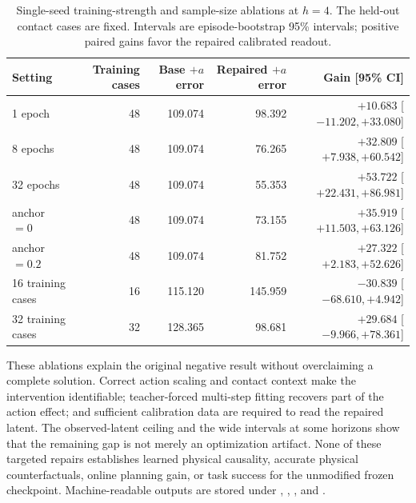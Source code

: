 \documentclass{article}
\begin{document}
\begin{table}[H]
\centering
\scriptsize
\setlength{\tabcolsep}{4pt}
\caption{Single-seed training-strength and sample-size ablations at $h=4$.
The held-out contact cases are fixed. Intervals are episode-bootstrap 95\%
intervals; positive paired gains favor the repaired calibrated readout.}
\label{tab:supp-teacher-forced-ablation}
\begin{tabular}{lrrrr}
\toprule
Setting & Training cases & Base $+a$ error & Repaired $+a$ error & Gain [95\% CI] \\
\midrule
1 epoch & 48 & 109.074 & 98.392 & $+10.683$ [$-11.202,+33.080$] \\
8 epochs & 48 & 109.074 & 76.265 & $+32.809$ [$+7.938,+60.542$] \\
32 epochs & 48 & 109.074 & 55.353 & $+53.722$ [$+22.431,+86.981$] \\
anchor $=0$ & 48 & 109.074 & 73.155 & $+35.919$ [$+11.503,+63.126$] \\
anchor $=0.2$ & 48 & 109.074 & 81.752 & $+27.322$ [$+2.183,+52.626$] \\
16 training cases & 16 & 115.120 & 145.959 & $-30.839$ [$-68.610,+4.942$] \\
32 training cases & 32 & 128.365 & 98.681 & $+29.684$ [$-9.966,+78.361$] \\
\bottomrule
\end{tabular}
\end{table}

These ablations explain the original negative result without overclaiming a
complete solution. Correct action scaling and contact context make the
intervention identifiable; teacher-forced multi-step fitting recovers part of
the action effect; and sufficient calibration data are required to read the
repaired latent. The observed-latent ceiling and the wide intervals at some
horizons show that the remaining gap is not merely an optimization artifact.
None of these targeted repairs establishes learned physical causality,
accurate physical counterfactuals, online planning gain, or task success for
the unmodified frozen checkpoint. Machine-readable outputs are stored under
,
,
, and
.
\end{document}
